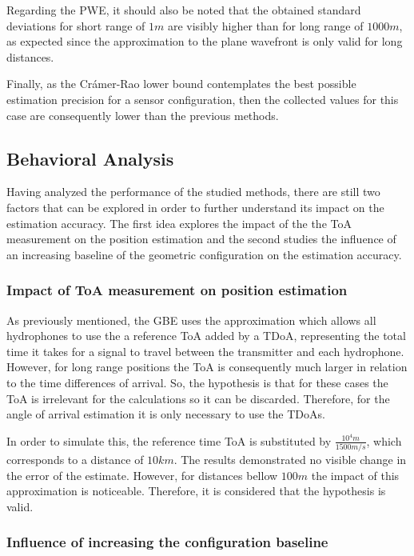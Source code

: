 Regarding the PWE, it should also be noted that the obtained standard deviations for short range of $1m$ are visibly higher than for long range of $1000m$, as expected since the approximation to the plane wavefront is only valid for long distances.

Finally, as the Crámer-Rao lower bound contemplates the best possible estimation precision for a sensor configuration, then the collected values for this case are consequently lower than the previous methods. 

\subsection{Behavioral Analysis}

Having analyzed the performance of the studied methods, there are still two factors that can be explored in order to further understand its impact on the estimation accuracy.  The first idea explores the impact of the the ToA measurement on the position estimation and the second studies the influence of an increasing baseline of the geometric configuration on the estimation accuracy.

\subsubsection{Impact of ToA measurement on position estimation}

As previously mentioned, the GBE uses the approximation which allows all hydrophones to use the a reference ToA added by a TDoA, representing the total time it takes for a signal to travel between the transmitter and each hydrophone. However, for long range positions the ToA is consequently much larger in relation to the time differences of arrival. So, the hypothesis is that for these cases the ToA is irrelevant for the calculations so it can be discarded. Therefore, for the angle of arrival estimation it is only necessary to use the TDoAs.

In order to simulate this, the reference time ToA is substituted by $\frac{10^4 m}{1500 m/s}$, which corresponds to a distance of $10 km$. The results demonstrated no visible change in the error of the estimate. However, for distances bellow $100m$ the impact of this approximation is noticeable. Therefore, it is considered that the hypothesis is valid. 

\subsubsection{Influence of increasing the configuration baseline}


